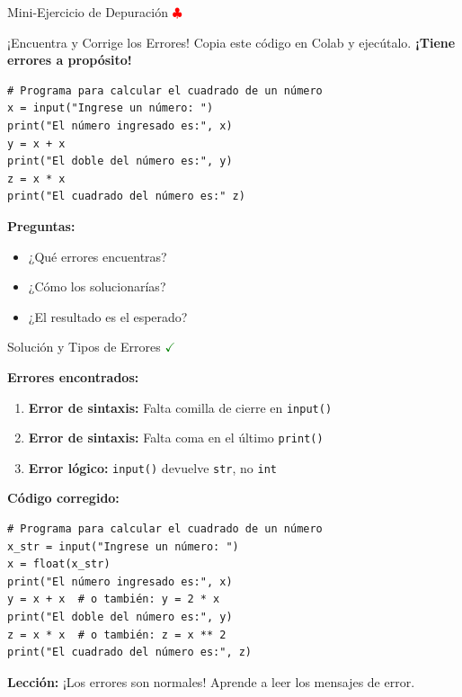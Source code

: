 \documentclass[10pt]{beamer}
\begin{document}
\begin{frame}[fragile]{Mini-Ejercicio de Depuración \hfill \textcolor{red}{$\clubsuit$}}
\begin{block}{¡Encuentra y Corrige los Errores!}
  Copia este código en Colab y ejecútalo. \textbf{¡Tiene errores a propósito!}
\end{block}

\begin{verbatim}
# Programa para calcular el cuadrado de un número
x = input("Ingrese un número: ")
print("El número ingresado es:", x)
y = x + x
print("El doble del número es:", y)
z = x * x
print("El cuadrado del número es:" z)
\end{verbatim}


\textbf{Preguntas:} 
\begin{itemize}
  \item ¿Qué errores encuentras?
  \item ¿Cómo los solucionarías?
  \item ¿El resultado es el esperado?
\end{itemize}
\end{frame}

\begin{frame}[fragile]{Solución y Tipos de Errores \hfill \textcolor{green}{$\checkmark$}}

\textbf{Errores encontrados:}
\begin{enumerate}
  \item \textbf{Error de sintaxis:} Falta comilla de cierre en \texttt{input()}
  \item \textbf{Error de sintaxis:} Falta coma en el último \texttt{print()}
  \item \textbf{Error lógico:} \texttt{input()} devuelve \texttt{str}, no \texttt{int}
\end{enumerate}

\textbf{Código corregido:}
\begin{verbatim}
# Programa para calcular el cuadrado de un número
x_str = input("Ingrese un número: ")
x = float(x_str)
print("El número ingresado es:", x)
y = x + x  # o también: y = 2 * x
print("El doble del número es:", y)
z = x * x  # o también: z = x ** 2
print("El cuadrado del número es:", z)
\end{verbatim}

\textbf{Lección:} ¡Los errores son normales! Aprende a leer los mensajes de error.
\end{frame}
\end{document}

